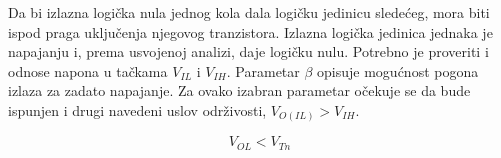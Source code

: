 Da bi izlazna logička nula jednog kola dala logičku jedinicu sledećeg, mora biti ispod praga uključenja njegovog tranzistora. Izlazna logička jedinica jednaka je napajanju i, prema usvojenoj analizi, daje logičku nulu. Potrebno je proveriti i odnose napona u tačkama $V_{IL}$ i $V_{IH}$. Parametar $\beta$ opisuje mogućnost pogona izlaza za zadato napajanje. Za ovako izabran parametar očekuje se da bude ispunjen i drugi navedeni uslov održivosti, $V_{O(IL)}>V_{IH}$.

\[V_{OL}<V_{Tn}\]

